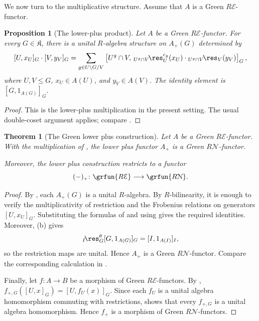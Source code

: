 \documentclass{amsart}
\numberwithin{equation}{section}%
\newtheorem{Thm}[equation]{Theorem}
\newtheorem{Prop}[equation]{Proposition}
\theoremstyle{remark}
\theoremstyle{definition}
\newcommand{\e}{\mathcal E}
\newcommand{\n}{\mathcal N}
\newcommand{\lres}[1]{{}_{#1}\!\res}
\begin{document}
%
We now turn to the multiplicative structure. Assume that $A$ is a
Green $R\e$-functor.
%
\begin{Prop}[The lower-plus product]
\label{prop:lower-plus-product}
Let $A$ be a Green $R\e$-functor. For every
$G\in\mathfrak K$, there is a unital $R$-algebra structure on
$A_+(G)$ determined by
%
\[
[U,x_U]_G\cdot[V,y_V]_G
=
\sum_{g\in U\backslash G/V}
\left[
U^g\cap V,\,
\lres{U^g\cap V}_U^{c_g}(x_U)
\cdot
\lres{U^g\cap V}_V(y_V)
\right]_G,
\]
%
where $U,V\leq G$, $x_U\in A(U)$, and $y_V\in A(V)$.
The identity element is $[G,1_{A(G)}]_G$.
\end{Prop}
%
\begin{proof}
This is the lower-plus multiplication in the present setting.
The usual double-coset argument applies; compare
\cite[Theorem~7.3 and the paragraph following it]
{BoltjeRaggiCardenasValeroElizondo19}.
\end{proof}
%
\begin{Thm}[The Green lower plus construction]
\label{thm:lower-plus-Green}
Let $A$ be a Green $R\e$-functor. With the multiplication of
, the lower plus functor $A_+$ is a
Green $R\n$-functor.
	
Moreover, the lower plus construction restricts to a functor
%
\[
(-)_{\scriptscriptstyle+}
\colon
\grfun{R\e}
\longrightarrow
\grfun{R\n}.
\]
%
\end{Thm}
%
\begin{proof}
By , each $A_+(G)$ is a unital
$R$-algebra. By $R$-bilinearity, it is enough to verify the
multiplicativity of restriction and the Frobenius relations on
generators $[U,x_U]_G$. Substituting the formulas of
 and using
 gives the required identities.
Moreover, (b) gives
%
\[
\lres{I}_G^\theta[G,1_{A(G)}]_G
=
[I,1_{A(I)}]_I,
\]
%
so the restriction maps are unital. Hence $A_+$ is a Green
$R\n$-functor. Compare the corresponding calculation in
\cite[Theorem~7.3(a)]{BoltjeRaggiCardenasValeroElizondo19}.

Finally, let $f\colon A\to B$ be a morphism of Green
$R\e$-functors. By ,
$f_{+,G}([U,x]_G)=[U,f_U(x)]_G$.
Since each $f_U$ is a unital algebra homomorphism commuting with
restrictions,  shows that every
$f_{+,G}$ is a unital algebra homomorphism. Hence $f_+$ is a
morphism of Green $R\n$-functors.
\end{proof}
\end{document}

